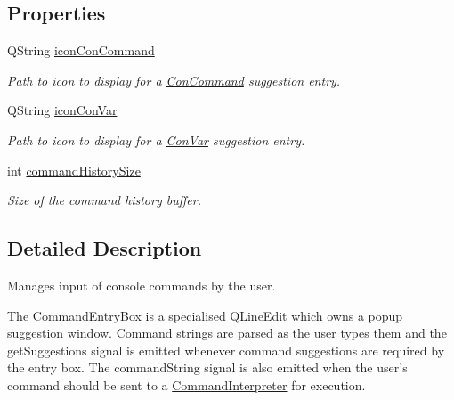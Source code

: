 \subsection*{Properties}
\begin{DoxyCompactItemize}
\item 
Q\-String \hyperlink{class_command_entry_box_ac53924ba07f11bab5b255af0625ffbd6}{icon\-Con\-Command}
\begin{DoxyCompactList}\small\item\em Path to icon to display for a \hyperlink{class_con_command}{Con\-Command} suggestion entry. \end{DoxyCompactList}\item 
Q\-String \hyperlink{class_command_entry_box_ad069b345272bd9d2fe43266ac5ead588}{icon\-Con\-Var}
\begin{DoxyCompactList}\small\item\em Path to icon to display for a \hyperlink{class_con_var}{Con\-Var} suggestion entry. \end{DoxyCompactList}\item 
int \hyperlink{class_command_entry_box_ad659bb8ce66cbf009d51d31ca2589207}{command\-History\-Size}
\begin{DoxyCompactList}\small\item\em Size of the command history buffer. \end{DoxyCompactList}\end{DoxyCompactItemize}


\subsection{Detailed Description}
Manages input of console commands by the user. 

The \hyperlink{class_command_entry_box}{Command\-Entry\-Box} is a specialised Q\-Line\-Edit which owns a popup suggestion window. Command strings are parsed as the user types them and the get\-Suggestions signal is emitted whenever command suggestions are required by the entry box. The command\-String signal is also emitted when the user's command should be sent to a \hyperlink{class_command_interpreter}{Command\-Interpreter} for execution. 

